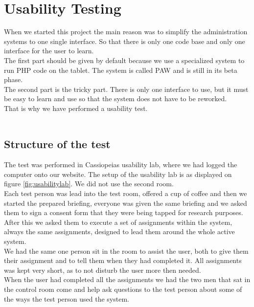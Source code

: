 \chapter{Usability Testing}
\label{chap:usabilityTesting}
When we started this project the main reason was to simplify the administration systems to one single interface. So that there is only one code base and only one interface for the user to learn.\\
The first part should be given by default because we use a specialized system to run PHP code on the tablet. The system is called PAW \citep{paw} and is still in its beta phase.\\
The second part is the tricky part. There is only one interface to use, but it must be easy to learn and use so that the system does not have to be reworked.\\
That is why we have performed a usability test.\\
\\

\section{Structure of the test}
The test was performed in Cassiopeias usability lab, where we had logged the computer onto our website. The setup of the usability lab is as displayed on figure \ref{fig:usabilitylab}. We did not use the second room.\\
Each test person was lead into the test room, offered a cup of coffee and then we started the prepared briefing, everyone was given the same briefing and we asked them to sign a consent form that they were being tapped for research purposes.\\
After this we asked them to execute a set of assignments within the system, always the same assignments, designed to lead them around the whole active system. \\
We had the same one person sit in the room to assist the user, both to give them their assignment and to tell them when they had completed it. All assignments was kept very short, as to not disturb the user more then needed.\\
When the user had completed all the assignments we had the two men that sat in the control room come and help ask questions to the test person about some of the ways the test person used the system.\\
\\

